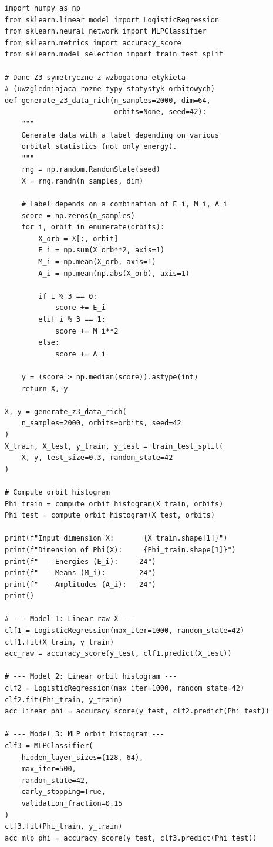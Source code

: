 \documentclass[11pt,a4paper]{report}
\begin{document}
\label{app:ch2-lst8}
\begin{lstlisting}[caption={Benchmark IV --- Orbit Histogram Network (BOHN)}]
import numpy as np
from sklearn.linear_model import LogisticRegression
from sklearn.neural_network import MLPClassifier
from sklearn.metrics import accuracy_score
from sklearn.model_selection import train_test_split

# Dane Z3-symetryczne z wzbogacona etykieta
# (uwzgledniajaca rozne typy statystyk orbitowych)
def generate_z3_data_rich(n_samples=2000, dim=64, 
                          orbits=None, seed=42):
    """
    Generate data with a label depending on various
    orbital statistics (not only energy).
    """
    rng = np.random.RandomState(seed)
    X = rng.randn(n_samples, dim)
    
    # Label depends on a combination of E_i, M_i, A_i
    score = np.zeros(n_samples)
    for i, orbit in enumerate(orbits):
        X_orb = X[:, orbit]
        E_i = np.sum(X_orb**2, axis=1)
        M_i = np.mean(X_orb, axis=1)
        A_i = np.mean(np.abs(X_orb), axis=1)
        
        if i % 3 == 0:
            score += E_i
        elif i % 3 == 1:
            score += M_i**2
        else:
            score += A_i
    
    y = (score > np.median(score)).astype(int)
    return X, y

X, y = generate_z3_data_rich(
    n_samples=2000, orbits=orbits, seed=42
)
X_train, X_test, y_train, y_test = train_test_split(
    X, y, test_size=0.3, random_state=42
)

# Compute orbit histogram
Phi_train = compute_orbit_histogram(X_train, orbits)
Phi_test = compute_orbit_histogram(X_test, orbits)

print(f"Input dimension X:       {X_train.shape[1]}")
print(f"Dimension of Phi(X):     {Phi_train.shape[1]}")
print(f"  - Energies (E_i):     24")
print(f"  - Means (M_i):        24")
print(f"  - Amplitudes (A_i):   24")
print()

# --- Model 1: Linear raw X ---
clf1 = LogisticRegression(max_iter=1000, random_state=42)
clf1.fit(X_train, y_train)
acc_raw = accuracy_score(y_test, clf1.predict(X_test))

# --- Model 2: Linear orbit histogram ---
clf2 = LogisticRegression(max_iter=1000, random_state=42)
clf2.fit(Phi_train, y_train)
acc_linear_phi = accuracy_score(y_test, clf2.predict(Phi_test))

# --- Model 3: MLP orbit histogram ---
clf3 = MLPClassifier(
    hidden_layer_sizes=(128, 64),
    max_iter=500,
    random_state=42,
    early_stopping=True,
    validation_fraction=0.15
)
clf3.fit(Phi_train, y_train)
acc_mlp_phi = accuracy_score(y_test, clf3.predict(Phi_test))


\end{lstlisting}
\end{document}
